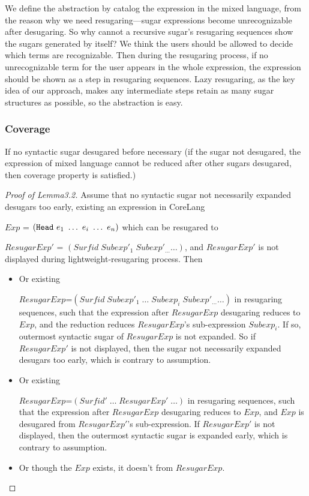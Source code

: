 We define the abstraction by catalog the expression in the mixed language, from the reason why we need resugaring---sugar expressions become unrecognizable after desugaring. So why cannot a recursive sugar's resugaring sequences show the sugars generated by itself? We think the users should be allowed to decide which terms are recognizable. Then during the resugaring process, if no unrecognizable term for the user appears in the whole expression, the expression should be shown as a step in resugaring sequences. Lazy resugaring, as the key idea of our approach, makes any intermediate steps retain as many sugar structures as possible, so the abstraction is easy.

\subsubsection{Coverage}
\begin{lemma}
If no syntactic sugar desugared before necessary (if the sugar not desugared, the expression of mixed language cannot be reduced after other sugars desugared, then coverage property is satisfied.)
\end{lemma}

\begin{proof}[Proof of Lemma3.2]
Assume that no syntactic sugar not necessarily expanded desugars too early, existing an expression in CoreLang

$Exp$ = $(\mbox{\tt Head}~e_1~\ldots~e_i~\ldots~e_n)$ which can be resugared to

$ResugarExp'$ = $(Surfid\;Subexp'_{1}\;Subexp'_{\ldots}\ldots)$, and $ResugarExp'$ is not displayed during lightweight-resugaring process. Then

\begin{itemize}
	\item Or existing

	$ResugarExp$=$(Surfid\;Subexp'_{1}\;\ldots\;Subexp_{i}\;Subexp'_{\ldots}\ldots)$ in resugaring sequences, such that the expression after $ResugarExp$ desugaring reduces to $Exp$, and the reduction reduces $ResugarExp$'s sub-expression $Subexp_{i}$. If so, outermost syntactic sugar of $ResugarExp$ is not expanded. So if $ResugarExp'$ is not displayed, then the sugar not necessarily expanded desugars too early, which is contrary to assumption.


	\item Or existing

	$ResugarExp$=$(Surfid'\;\ldots\;ResugarExp'\;\ldots)$ in resugaring sequences, such that the expression after $ResugarExp$ desugaring reduces to $Exp$, and $Exp$ is desugared from $ResugarExp'$'s sub-expression. If $ResugarExp'$ is not displayed, then the outermost syntactic sugar is expanded early, which is contrary to assumption.
	\item Or though the $Exp$ exists, it doesn't from $ResugarExp$.

\end{itemize}
\end{proof}


